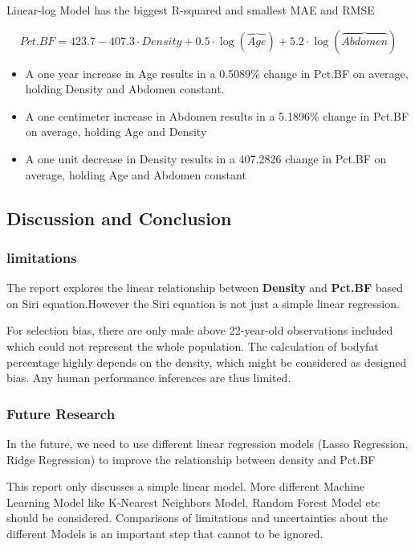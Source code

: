 \documentclass[letterpaper,9pt,twocolumn,twoside,]{pinp}
\begin{document}
Linear-log Model has the biggest R-squared and smallest MAE and RMSE

\[Pct.BF = 423.7 - 407.3 \cdot Density + 0.5 \cdot \log(\overbrace{Age}) + 5.2 \cdot \log(\overbrace{Abdomen})\]

\begin{itemize}
\item
  A one year increase in Age results in a 0.5089\% change in Pct.BF on
  average, holding Density and Abdomen constant.
\item
  A one centimeter increase in Abdomen results in a 5.1896\% change in
  Pct.BF on average, holding Age and Density
\item
  A one unit decrease in Density results in a 407.2826 change in Pct.BF
  on average, holding Age and Abdomen constant
\end{itemize}

\hypertarget{discussion-and-conclusion}{%
\subsection{Discussion and Conclusion}\label{discussion-and-conclusion}}

\hypertarget{limitations}{%
\subsubsection{limitations}\label{limitations}}

The report explores the linear relationship between \textbf{Density} and
\textbf{Pct.BF} based on Siri equation.However the Siri equation is not
just a simple linear regression.

For selection bias, there are only male above 22-year-old observations
included which could not represent the whole population. The calculation
of bodyfat percentage highly depends on the density, which might be
considered as designed bias. Any human performance inferences are thus
limited.

\hypertarget{future-research}{%
\subsubsection{Future Research}\label{future-research}}

In the future, we need to use different linear regression models (Lasso
Regression, Ridge Regression) to improve the relationship between
density and Pct.BF

This report only discusses a simple linear model. More different Machine
Learning Model like K-Nearest Neighbors Model, Random Forest Model etc
should be considered. Comparisons of limitations and uncertainties about
the different Models is an important step that cannot to be ignored.
\end{document}
